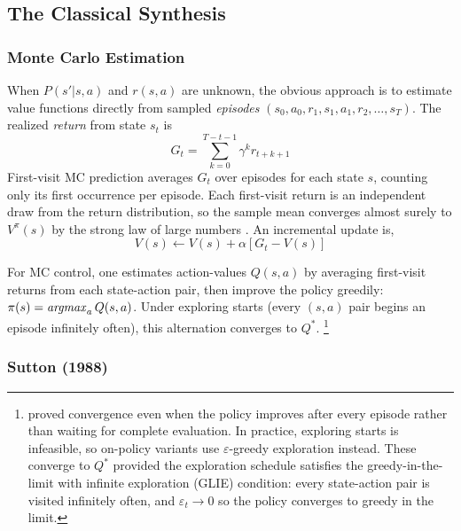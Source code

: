 
\subsection{The Classical Synthesis}
\label{sec:classical_synthesis}

\subsubsection{Monte Carlo Estimation}

When $P(s'|s,a)$ and $r(s,a)$ are unknown, the obvious approach is to estimate value functions directly from sampled \textit{episodes} $(s_0, a_0, r_1, s_1, a_1, r_2, \ldots, s_T)$. The realized \textit{return} from state $s_t$ is
\begin{equation}
G_t = \sum_{k=0}^{T-t-1} \gamma^k r_{t+k+1}
\end{equation}
First-visit MC prediction averages $G_t$ over episodes for each state $s$, counting only its first occurrence per episode. Each first-visit return is an independent draw from the return distribution, so the sample mean converges almost surely to $V^\pi(s)$ by the strong law of large numbers \citep{sutton2018}. An incremental update is, $$V(s) \leftarrow V(s) + \alpha[G_t - V(s)]$$

For MC control, one estimates action-values $Q(s,a)$ by averaging first-visit returns from each state-action pair, then improve the policy greedily: $\pi(s) = \mathop{\it argmax}_a Q(s,a)$. Under exploring starts (every $(s,a)$ pair begins an episode infinitely often), this alternation converges to $Q^*$. \footnote{\citet{tsitsiklis2002} proved convergence even when the policy improves after every episode rather than waiting for complete evaluation. In practice, exploring starts is infeasible, so on-policy variants use $\varepsilon$-greedy exploration instead. These converge to $Q^*$ provided the exploration schedule satisfies the greedy-in-the-limit with infinite exploration (GLIE) condition: every state-action pair is visited infinitely often, and $\varepsilon_t \to 0$ so the policy converges to greedy in the limit.}

\subsubsection{Sutton (1988)}

